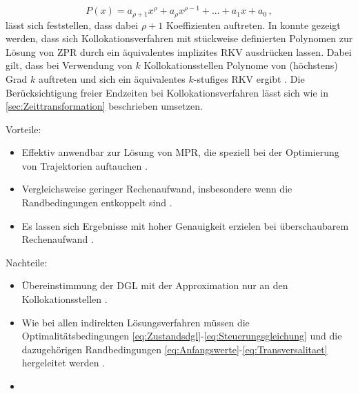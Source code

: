 \begin{equation}
	P(x) = a_{\rho+1}x^\rho + a_{\rho}x^{\rho-1} + ... + a_{1}x + a_0\,,
\end{equation}
lässt sich feststellen, dass dabei $\rho+1$ Koeffizienten auftreten. In \cite{Ascher.1995c5} konnte gezeigt werden, dass sich Kollokationsverfahren mit stückweise definierten Polynomen zur Lösung von \gls{ZPR} durch ein äquivalentes implizites \gls{RKV} ausdrücken lassen. Dabei gilt, dass bei Verwendung von $k$ Kollokationsstellen Polynome von (höchstens) Grad $k$ auftreten und sich ein äquivalentes $k$-stufiges \gls{RKV} ergibt \cite{Ascher.1995c5}. Die Berücksichtigung freier Endzeiten bei Kollokationsverfahren lässt sich wie in \ref{sec:Zeittransformation} beschrieben umsetzen. 
\newpage
\begin{multicols}{2}
	Vorteile:
	\begin{itemize}
		\item Effektiv anwendbar zur Lösung von \gls{MPR}, die speziell bei der Optimierung von Trajektorien auftauchen \cite{Betts.1998}.
		\item Vergleichsweise geringer Rechenaufwand, insbesondere wenn die Randbedingungen entkoppelt sind \cite{Cash.1980}.
		\item Es lassen sich Ergebnisse mit hoher Genauigkeit erzielen bei überschaubarem Rechenaufwand \cite{Cash.1980}.
	\end{itemize}
	
	\columnbreak
	
	Nachteile:
	\begin{itemize}
		\item Übereinstimmung der \gls{DGL} mit der Approximation nur an den Kollokationsstellen \cite{Betts.1998}.	
		\item Wie bei allen indirekten Lösungsverfahren müssen die Optimalitätsbedingungen \eqref{eq:Zustandsdgl}-\eqref{eq:Steuerungsgleichung} und die dazugehörigen Randbedingungen \eqref{eq:Anfangswerte}-\eqref{eq:Transversalitaet} hergeleitet werden \cite{Betts.1998}.

		\item[\vspace{\fill}]
	\end{itemize}
\end{multicols}
